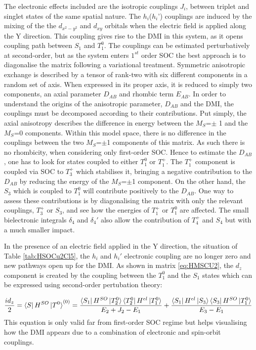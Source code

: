 \documentclass[10pt]{report}
\numberwithin{equation}{section}
\begin{document}
The electronic effects included are the isotropic couplings $J_i$, between triplet and singlet states of the same spatial nature. 
The $h_i$($h_i$') couplings are induced by the mixing of the the $d_{x^2-y^2}$ and $d_{xy}$ orbitals when the electric field is applied along the Y direction.
This coupling gives rise to the DMI in this system, as it opens coupling path between $S_1$ and $T_1^0$.
The couplings can be estimated perturbatively at second-order, but as the system enters $1^{st}$ order SOC the best approach is to diagonalise the matrix following a variational treatment.
Symmetric anisotropic exchange is described by a tensor of rank-two with six different components in a random set of axis.
When expressed in its proper axis, it is reduced to simply two components, an axial parameter $D_{AB}$ and rhombic term $E_{AB}$.
In order to understand the origins of the anisotropic parameter, $D_{AB}$ and the DMI, the couplings must be decomposed according to their contributions.
Put simply, the axial anisotropy describes the difference in energy between the $M_S$=$\pm$ 1 and the $M_S$=0 components.
Within this model space, there is no difference in the couplings between the two $M_S$=$\pm$1 components of this matrix.
As such there is no rhombicity, when considering only first-order SOC.
Hence to estimate the $D_{AB}$, one has to look for states coupled to either $T_1^0$ or $T_1^+$.
The $T_1^+$ component is coupled via SOC to $T_3^+$ which stabilises it, bringing a negative contribution to the $D_{AB}$ by reducing the energy of the $M_S$=$\pm$1 component.
On the other hand, the $S_3$ which is coupled to $T_1^0$ will contribute positively to the $D_{AB}$. 
One way to assess these contributions is by diagonalising the matrix with only the relevant couplings, $T_3^+$ or $S_3$, and see how the energies of $T_1^+$ or $T_1^0$ are affected.
The small bielectronic integrals $\delta_4$ and $\delta_4'$ also allow the contribution of $T_4^+$ and $S_4$ but with a much smaller impact.

In the presence of an electric field applied in the Y direction, the situation of Table \ref{tab:HSOCu2Cl5}, the $h_i$ and $h_i'$ electronic coupling are no longer zero and new pathways open up for the DMI.
As shown in matrix \ref{eq:HMSCU2}, the $d_z$ component is created by the coupling between the $T_1^0$ and the $S_1$ states which can be expressed using second-order pertubation theory:

\begin{equation}\label{eq:chemindmi}
    \frac{id_z}{2}=\bra{S}H^{SO}\ket{T^0}^{(0)}=\frac{\bra{S_1}H^{SO}\ket{T_2^0}\bra{T_2^0}H^{el}\ket{T_1^0}}{E_2+J_2-E_1}+\frac{\bra{S_1}H^{el}\ket{S_3}\bra{S_3}H^{SO}\ket{T_1^0}}{E_3-E_1}
\end{equation}
This equation is only valid far from first-order SOC regime but helps visualising how the DMI appears due to a combination of electronic and spin-orbit couplings.
\end{document}
